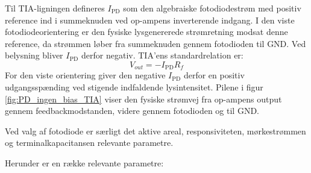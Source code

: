 Til TIA-ligningen defineres $I_{\mathrm{PD}}$ som den algebraiske fotodiodestrøm med positiv reference ind i summeknuden ved op-ampens inverterende indgang. I den viste fotodiodeorientering er den fysiske lysgenererede strømretning modsat denne reference, da strømmen løber fra summeknuden gennem fotodioden til GND. Ved belysning bliver $I_{\mathrm{PD}}$ derfor negativ. TIA'ens standardrelation er:
\begin{equation}
    V_{out}=-I_{\mathrm{PD}}R_f
\end{equation}
For den viste orientering giver den negative $I_{\mathrm{PD}}$ derfor en positiv udgangsspænding ved stigende indfaldende lysintensitet. Pilene i figur \ref{fig:PD_ingen_bias_TIA} viser den fysiske strømvej fra op-ampens output gennem feedbackmodstanden, videre gennem fotodioden og til GND.

Ved valg af fotodiode er særligt det aktive areal, responsiviteten, mørkestrømmen og terminalkapacitansen relevante parametre.

Herunder er en række relevante parametre:

